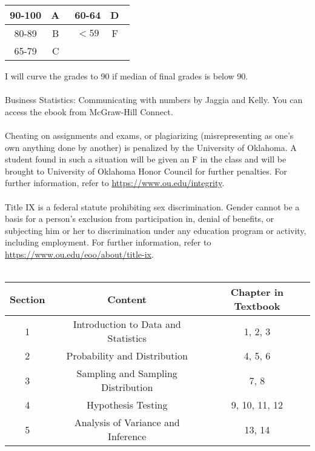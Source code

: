 \documentclass[12pt,letterpaper]{article}
\begin{document}
	\begin{center}
		\begin{tabular}{|c|c|c|c|}
			\hline
			90-100 & A\quad \ &  60-64&  D\quad \ \\ \hline
			80-89& B\quad \ &  $<59$ & F\quad \ \\ \hline
			65-79& C\quad \ &   &   \\ \hline
		\end{tabular}
	\end{center}
	{\color{blue} I will curve the grades to 90 if median of final grades is below 90.}\bigskip\\
	\medskip\\
Business Statistics: Communicating with numbers by Jaggia and Kelly. You can access the ebook from McGraw-Hill Connect.\bigskip\\
	\medskip\\
	Cheating on assignments and exams, or plagiarizing (misrepresenting as one’s own anything done by another) is penalized by the University of Oklahoma. A student found in such a situation will be given an F in the class and will be brought to University of Oklahoma Honor Council for further penalties. For further information, refer to \href{https://www.ou.edu/integrity}{https://www.ou.edu/integrity}.\bigskip\\
	\medskip\\
	Title IX is a federal statute prohibiting sex discrimination. Gender cannot be a basis for a person’s exclusion from participation in, denial of benefits, or subjecting him or her to discrimination under any education program or activity, including employment. For further information, refer to \href{https://www.ou.edu/eoo/about/title-ix}{https://www.ou.edu/eoo/about/title-ix}.\bigskip\\
	\medskip\\
	\begin{center}
		\begin{tabular}{ccc}
			\toprule
			Section & Content&Chapter in Textbook\\
			\midrule
			1 & Introduction to Data and Statistics&1, 2, 3\\
			\midrule
			2 & Probability and Distribution&4, 5, 6\\
			\midrule
			3 & Sampling and Sampling Distribution&7, 8\\
			\midrule
			4 & Hypothesis Testing&9, 10, 11, 12\\
			\midrule
			5 & Analysis of Variance and Inference&13, 14\\
			\bottomrule
		\end{tabular}
	\end{center}
\end{document}
